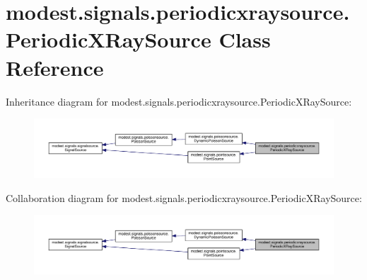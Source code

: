 \hypertarget{classmodest_1_1signals_1_1periodicxraysource_1_1PeriodicXRaySource}{}\section{modest.\+signals.\+periodicxraysource.\+Periodic\+X\+Ray\+Source Class Reference}
\label{classmodest_1_1signals_1_1periodicxraysource_1_1PeriodicXRaySource}


Inheritance diagram for modest.\+signals.\+periodicxraysource.\+Periodic\+X\+Ray\+Source\+:
\nopagebreak
\begin{figure}[H]
\begin{center}
\leavevmode
\includegraphics[width=350pt]{classmodest_1_1signals_1_1periodicxraysource_1_1PeriodicXRaySource__inherit__graph}
\end{center}
\end{figure}


Collaboration diagram for modest.\+signals.\+periodicxraysource.\+Periodic\+X\+Ray\+Source\+:
\nopagebreak
\begin{figure}[H]
\begin{center}
\leavevmode
\includegraphics[width=350pt]{classmodest_1_1signals_1_1periodicxraysource_1_1PeriodicXRaySource__coll__graph}
\end{center}
\end{figure}
